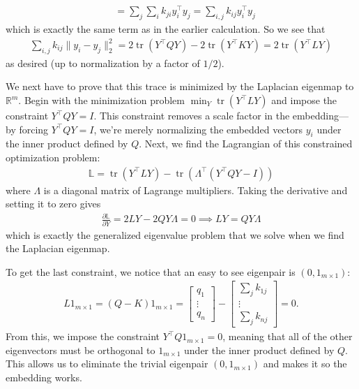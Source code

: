 \documentclass{letter}
\newcounter{problem}
\newcommand{\T}{\intercal}
\newcommand{\R}{\mathbb{R}}
\DeclareMathOperator{\tr}{tr}
\begin{document}
{\begin{align*}
        &= \sum_j \sum_i k_{ji}y_i^\T y_j = \sum_{i, j} k_{ij} y_i^\T y_j
    \end{align*} which is exactly the same term as in the earlier calculation. So we see that \begin{align*}
        \sum_{i, j} k_{ij}\|y_i - y_j\|^2_2 = 2\tr(Y^\T QY) - 2\tr(Y^\T KY) = 2\tr(Y^\T LY)
    \end{align*} as desired (up to normalization by a factor of $1/2$). 
    
    We next have to prove that this trace is minimized by the Laplacian eigenmap to $\R^m$. Begin with the minimization problem $\min_Y \tr(Y^\T L Y)$ and impose the constraint $Y^\T Q Y = I$. This constraint removes a scale factor in the embedding---by forcing $Y^\T Q Y = I$, we're merely normalizing the embedded vectors $y_i$ under the inner product defined by $Q$. Next, we find the Lagrangian of this constrained optimization problem: \begin{align*}
        \mathbb{L} = \tr(Y^\T L Y) - \tr(\Lambda^\T (Y^\T QY - I))
    \end{align*} where $\Lambda$ is a diagonal matrix of Lagrange multipliers. Taking the derivative and setting it to zero gives \begin{align*}
        \frac{\partial \mathbb{L}}{\partial Y} = 2LY - 2QY\Lambda = 0 \implies LY = QY\Lambda
    \end{align*} which is exactly the generalized eigenvalue problem that we solve when we find the Laplacian eigenmap.
    
    To get the last constraint, we notice that an easy to see eigenpair is $(0, 1_{m\times 1})$: \begin{align*}
        L1_{m\times 1} = (Q - K)1_{m\times 1} = \begin{bmatrix} q_1 \\ \vdots \\ q_n \end{bmatrix} - \begin{bmatrix} \sum_j k_{1j} \\ \vdots \\ \sum_j k_{nj} \end{bmatrix} = 0.
    \end{align*} From this, we impose the constraint $Y^\T Q 1_{m\times 1} = 0$, meaning that all of the other eigenvectors must be orthogonal to $1_{m\times 1}$ under the inner product defined by $Q$. This allows us to eliminate the trivial eigenpair $(0, 1_{m\times 1})$ and makes it so the embedding works.}
\end{document}
